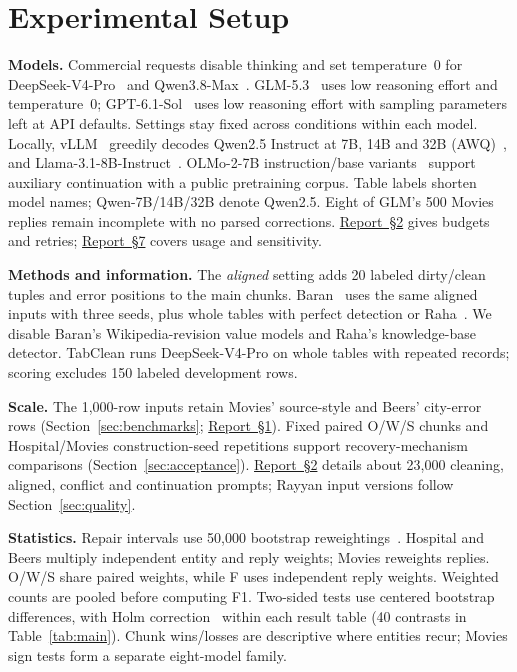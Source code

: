 \documentclass[sigconf, nonacm]{acmart}
\newcommand{\companionref}[1]{\href{https://github.com/hinsonver/CoRe-Benchmark/raw/refs/heads/main/paper/CoRe-Supplementary-Technical-Report.pdf\#nameddest=companion-#1}{Report~\S#1}}
\begin{document}
\section{Experimental Setup}\label{sec:setup}

\textbf{Models.} Commercial requests disable thinking and set temperature~0 for
DeepSeek-V4-Pro~\cite{deepseekai2026deepseekv4} and Qwen3.8-Max~\cite{qwen38}.
GLM-5.3~\cite{zai2026glm53} uses low reasoning effort and temperature~0;
GPT-6.1-Sol~\cite{openai2026gpt61sol} uses low reasoning effort with sampling parameters
left at API defaults. Settings stay fixed across conditions within each model.
Locally, vLLM~\cite{kwon2023vllm} greedily decodes
Qwen2.5 Instruct at 7B, 14B and 32B (AWQ)~\cite{qwen2025qwen25}, and
Llama-3.1-8B-Instruct~\cite{dubey2024llama3}. OLMo-2-7B instruction/base
variants~\cite{olmo2024olmo2} support auxiliary continuation with a public pretraining corpus.
Table labels shorten model names; Qwen-7B/14B/32B denote Qwen2.5.
Eight of GLM's 500 Movies replies remain incomplete with no parsed corrections.
\companionref{2} gives budgets and retries; \companionref{7} covers usage and sensitivity.

\textbf{Methods and information.} The \emph{aligned} setting adds 20 labeled dirty/clean tuples
and error positions to the main chunks. Baran~\cite{mahdavi2020baran} uses the same aligned
inputs with three seeds, plus whole tables with perfect detection or
Raha~\cite{mahdavi2019raha}. We disable Baran's Wikipedia-revision value models and Raha's
knowledge-base detector. TabClean runs DeepSeek-V4-Pro on whole tables with repeated records;
scoring excludes 150 labeled development rows.

\textbf{Scale.} The 1,000-row inputs retain Movies' source-style and Beers' city-error rows
(Section~\ref{sec:benchmarks}; \companionref{1}). Fixed paired O/W/S chunks and Hospital/Movies
construction-seed repetitions support recovery-mechanism comparisons
(Section~\ref{sec:acceptance}). \companionref{2} details about 23,000 cleaning,
aligned, conflict and continuation prompts; Rayyan input versions follow Section~\ref{sec:quality}.

\textbf{Statistics.} Repair intervals use 50,000 bootstrap reweightings~\cite{efron1993bootstrap,owen2012arrays}.
Hospital and Beers multiply independent entity and reply weights; Movies reweights replies.
O/W/S share paired weights, while F uses independent reply weights. Weighted counts are
pooled before computing F1. Two-sided tests use centered bootstrap differences, with
Holm correction~\cite{holm1979simple} within each result table (40 contrasts in
Table~\ref{tab:main}). Chunk wins/losses are descriptive where entities recur;
Movies sign tests form a separate eight-model family.
\end{document}
